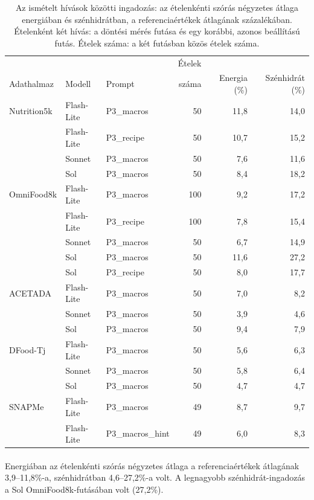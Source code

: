 \begin{table}[h]
\centering
\caption{Az ismételt hívások közötti ingadozás: az ételenkénti szórás négyzetes átlaga 
energiában és szénhidrátban, a referenciaértékek átlagának százalékában. Ételenként két 
hívás: a döntési mérés futása és egy korábbi, azonos beállítású futás. Ételek száma: a két 
futásban közös ételek száma.}
\label{tab:konzisztencia}
\small
\begin{tabular}{lllrrr}
\hline
 & & & Ételek & & \\
Adathalmaz & Modell & Prompt & száma & Energia (\%) & Szénhidrát (\%) \\
\hline
Nutrition5k & Flash-Lite & P3\_macros & 50 & 11{,}8 & 14{,}0 \\
 & Flash-Lite & P3\_recipe & 50 & 10{,}7 & 15{,}2 \\
 & Sonnet & P3\_macros & 50 & 7{,}6 & 11{,}6 \\
 & Sol & P3\_macros & 50 & 8{,}4 & 18{,}2 \\
\hline
OmniFood8k & Flash-Lite & P3\_macros & 100 & 9{,}2 & 17{,}2 \\
 & Flash-Lite & P3\_recipe & 100 & 7{,}8 & 15{,}4 \\
 & Sonnet & P3\_macros & 50 & 6{,}7 & 14{,}9 \\
 & Sol & P3\_macros & 50 & 11{,}6 & 27{,}2 \\
 & Sol & P3\_recipe & 50 & 8{,}0 & 17{,}7 \\
\hline
ACETADA & Flash-Lite & P3\_macros & 50 & 7{,}0 & 8{,}2 \\
 & Sonnet & P3\_macros & 50 & 3{,}9 & 4{,}6 \\
 & Sol & P3\_macros & 50 & 9{,}4 & 7{,}9 \\
\hline
DFood-Tj & Flash-Lite & P3\_macros & 50 & 5{,}6 & 6{,}3 \\
 & Sonnet & P3\_macros & 50 & 5{,}8 & 6{,}4 \\
 & Sol & P3\_macros & 50 & 4{,}7 & 4{,}7 \\
\hline
SNAPMe & Flash-Lite & P3\_macros & 49 & 8{,}7 & 9{,}7 \\
 & Flash-Lite & P3\_macros\_hint & 49 & 6{,}0 & 8{,}3 \\
\hline
\end{tabular}
\end{table}

\paragraph{}Energiában az ételenkénti szórás négyzetes átlaga a referenciaértékek 
átlagának 3,9--11,8\%-a, szénhidrátban 4,6--27,2\%-a volt. A legnagyobb szénhidrát-ingadozás a Sol OmniFood8k-futásában 
volt (27,2\%).

